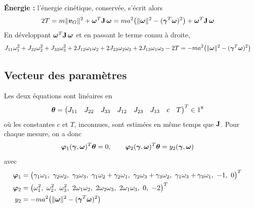 \textbf{Énergie : } l'énergie cinétique, conservée, s'écrit alors
\[
    2T = m\|\bm{v}_G\|^2 + \bm{\omega}^T\mathbf{J}\,\bm{\omega}
    = m a^2\bigl(\|\bm{\omega}\|^2 - (\bm{\gamma}^T\bm{\omega})^2\bigr)
    + \bm{\omega}^T\mathbf{J}\,\bm{\omega}
\]
En développant $\bm{\omega}^T\mathbf{J}\,\bm{\omega}$ et en passant
le terme connu à droite,
\[
    J_{11}\omega_1^2 + J_{22}\omega_2^2 + J_{33}\omega_3^2
    + 2J_{12}\omega_1\omega_2 + 2J_{23}\omega_2\omega_3
    + 2J_{13}\omega_1\omega_3 - 2T
    = -m a^2\bigl(\|\bm{\omega}\|^2 - (\bm{\gamma}^T\bm{\omega})^2\bigr)
\]

\subsection{Vecteur des paramètres}

Les deux équations sont linéaires en
\[
    \bm{\theta} = \begin{pmatrix}
        J_{11} & J_{22} & J_{33} & J_{12} & J_{23} & J_{13} & c & T
    \end{pmatrix}^T \in 1^8
\]
où les constantes $c$ et $T$, inconnues, sont estimées en même temps
que $\mathbf{J}$. Pour chaque mesure, on a donc
\[
    \bm{\varphi}_1(\bm{\gamma}, \bm{\omega})^T\bm{\theta} = 0,
    \qquad
    \bm{\varphi}_2(\bm{\gamma}, \bm{\omega})^T\bm{\theta} = y_2(\bm{\gamma}, \bm{\omega})
\]
avec
\begin{align*}
    \bm{\varphi}_1 &= \bigl(\gamma_1\omega_1,\ \gamma_2\omega_2,\
        \gamma_3\omega_3,\ \gamma_1\omega_2 + \gamma_2\omega_1,\
        \gamma_2\omega_3 + \gamma_3\omega_2,\
        \gamma_1\omega_3 + \gamma_3\omega_1,\ -1,\ 0\bigr)^T\\
    \bm{\varphi}_2 &= \bigl(\omega_1^2,\ \omega_2^2,\ \omega_3^2,\
        2\omega_1\omega_2,\ 2\omega_2\omega_3,\ 2\omega_1\omega_3,\
        0,\ -2\bigr)^T\\
    y_2 &= -m a^2\bigl(\|\bm{\omega}\|^2 - (\bm{\gamma}^T\bm{\omega})^2\bigr)
\end{align*}
